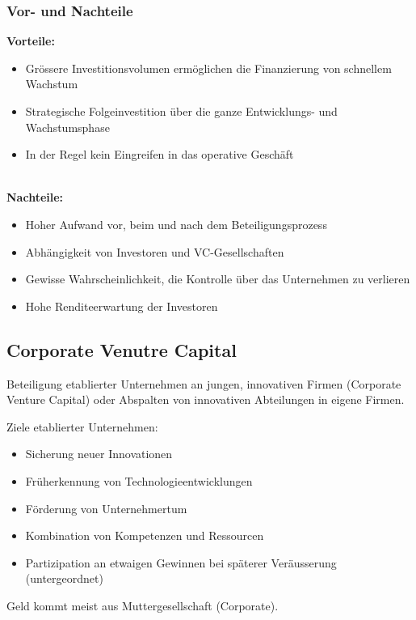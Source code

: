 \subsubsection{Vor- und Nachteile}
\begin{multicols}{2}
	\textbf{Vorteile:}
	\begin{itemize}
		\item Grössere Investitionsvolumen ermöglichen die Finanzierung von schnellem Wachstum
		\item Strategische Folgeinvestition über die ganze Entwicklungs- und Wachstumsphase
		\item In der Regel kein Eingreifen in das operative Geschäft
	\end{itemize}
	\ \\
	\textbf{Nachteile:}
	\begin{itemize}
		\item Hoher Aufwand vor, beim und nach dem Beteiligungsprozess
		\item Abhängigkeit von Investoren und VC-Gesellschaften
		\item Gewisse Wahrscheinlichkeit, die Kontrolle über das Unternehmen zu verlieren
		\item Hohe Renditeerwartung der Investoren
	\end{itemize}
\end{multicols}

\subsection{Corporate Venutre Capital}
Beteiligung etablierter Unternehmen an jungen, innovativen Firmen (Corporate Venture Capital) oder Abspalten von innovativen Abteilungen in eigene Firmen.

Ziele etablierter Unternehmen:
\begin{itemize}
	\item Sicherung neuer Innovationen
	\item Früherkennung von Technologieentwicklungen
	\item Förderung von Unternehmertum
	\item Kombination von Kompetenzen und Ressourcen
	\item Partizipation an etwaigen Gewinnen bei späterer Veräusserung (untergeordnet)
\end{itemize}
Geld kommt meist aus Muttergesellschaft (Corporate).

